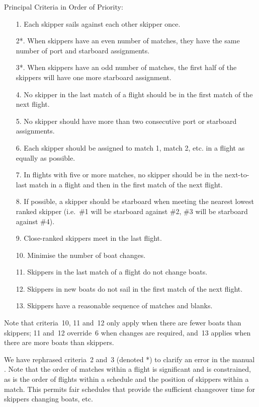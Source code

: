 \documentclass{llncs}
\begin{document}
\begin{framed}
\noindent Principal Criteria in Order of Priority:
\begin{enumerate}
\item[1.] Each skipper sails against each other skipper once.
\item[2*.] When skippers have an even number of matches, they have the same number of port and starboard
    assignments.
\item[3*.] When skippers have an odd number of matches, the first half of the skippers will have one
    more starboard assignment.
\item[4.] No skipper in the last match of a flight should be in the first match of the next flight.
\item[5.] No skipper should have more than two consecutive port or starboard assignments.
\item[6.] Each skipper should be assigned to match 1, match 2, etc. in a flight as equally as possible.
\item[7.] In flights with five or more matches, no skipper should be in the next-to-last match in a
    flight and then in the first match of the next flight.
\item[8.] If possible, a skipper should be starboard when meeting the nearest lowest ranked skipper
    (i.e.\ \#1 will be starboard against \#2, \#3 will be starboard against \#4).
\item[9.] Close-ranked skippers meet in the last flight.
\item[10.] Minimise the number of boat changes.
\item[11.] Skippers in the last match of a flight do not change boats.
\item[12.] Skippers in new boats do not sail in the first match of the next flight.
\item[13.] Skippers have a reasonable sequence of matches and blanks.
\end{enumerate}
Note that criteria~10, 11 and~12 only apply when there are fewer boats than skippers; 11 and~12
override~6 when changes are required, and~13 applies when there are more boats than skippers.
\end{framed}

We have rephrased criteria~2 and~3 (denoted *) to clarify an error in the manual \cite{isaf}. Note
that the order of matches within a flight is significant and is constrained, as is the order of
flights within a schedule and the position of skippers within a match. This permits fair schedules
that provide the sufficient changeover time for skippers changing boats, etc.
\end{document}
